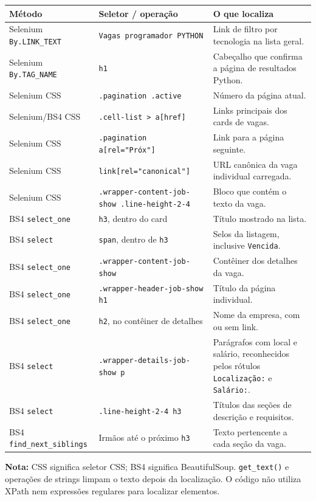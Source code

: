 \documentclass[10pt,a4paper]{article}
\begin{document}
\small
\setlength{\tabcolsep}{4pt}
\begin{tabularx}{\textwidth}{@{}p{3.2cm}p{5.8cm}X@{}}
\toprule
\textbf{Método} & \textbf{Seletor / operação} & \textbf{O que localiza} \\
\midrule
Selenium \texttt{By.LINK\_TEXT} & \texttt{Vagas programador PYTHON} & Link de filtro por tecnologia na lista geral. \\
Selenium \texttt{By.TAG\_NAME} & \texttt{h1} & Cabeçalho que confirma a página de resultados Python. \\
Selenium CSS & \texttt{.pagination .active} & Número da página atual. \\
Selenium/BS4 CSS & \texttt{.cell-list > a[href]} & Links principais dos cards de vagas. \\
Selenium CSS & \texttt{.pagination a[rel="Próx"]} & Link para a página seguinte. \\
Selenium CSS & \texttt{link[rel="canonical"]} & URL canônica da vaga individual carregada. \\
Selenium CSS & \texttt{.wrapper-content-job-show .line-height-2-4} & Bloco que contém o texto da vaga. \\
BS4 \texttt{select\_one} & \texttt{h3}, dentro do card & Título mostrado na lista. \\
BS4 \texttt{select} & \texttt{span}, dentro de \texttt{h3} & Selos da listagem, inclusive \texttt{Vencida}. \\
BS4 \texttt{select\_one} & \texttt{.wrapper-content-job-show} & Contêiner dos detalhes da vaga. \\
BS4 \texttt{select\_one} & \texttt{.wrapper-header-job-show h1} & Título da página individual. \\
BS4 \texttt{select\_one} & \texttt{h2}, no contêiner de detalhes & Nome da empresa, com ou sem link. \\
BS4 \texttt{select} & \texttt{.wrapper-details-job-show p} & Parágrafos com local e salário, reconhecidos pelos rótulos \texttt{Localização:} e \texttt{Salário:}. \\
BS4 \texttt{select} & \texttt{.line-height-2-4 h3} & Títulos das seções de descrição e requisitos. \\
BS4 \texttt{find\_next\_siblings} & Irmãos até o próximo \texttt{h3} & Texto pertencente a cada seção da vaga. \\
\bottomrule
\end{tabularx}
\normalsize

\vspace{0.35cm}
\noindent\textbf{Nota:} CSS significa seletor CSS; BS4 significa BeautifulSoup. \texttt{get\_text()} e operações de strings limpam o texto depois da localização. O código não utiliza XPath nem expressões regulares para localizar elementos.
\end{document}
